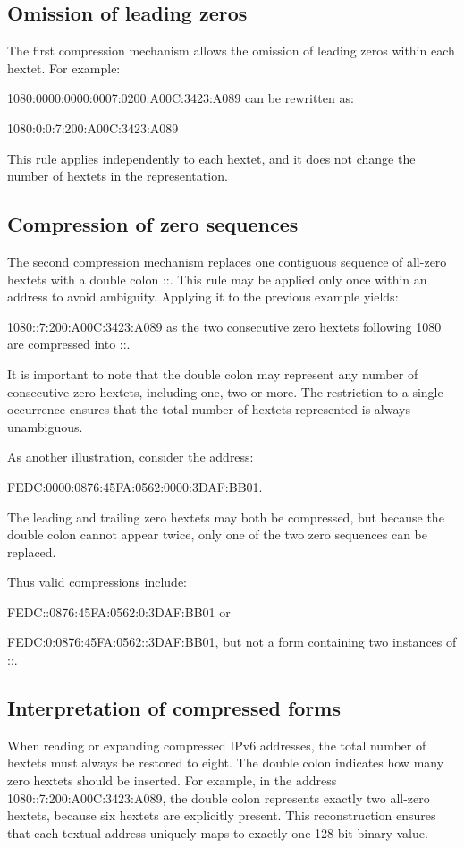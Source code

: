 \subsection{Omission of leading zeros}

The first compression mechanism allows the omission of leading zeros within each hextet. For example:

1080:0000:0000:0007:0200:A00C:3423:A089 can be rewritten as:

1080:0:0:7:200:A00C:3423:A089

This rule applies independently to each hextet, and it does not change the number of hextets in the representation.

\subsection{Compression of zero sequences}

The second compression mechanism replaces one contiguous sequence of all-zero hextets with a double colon ::. This rule may be applied only once within an address to avoid ambiguity. Applying it to the previous example yields:

1080::7:200:A00C:3423:A089 as the two consecutive zero hextets following 1080 are compressed into ::.

It is important to note that the double colon may represent any number of consecutive zero hextets, including one, two or more. The restriction to a single occurrence ensures that the total number of hextets represented is always unambiguous.

As another illustration, consider the address:

FEDC:0000:0876:45FA:0562:0000:3DAF:BB01.

The leading and trailing zero hextets may both be compressed, but because the double colon cannot appear twice, only one of the two zero sequences can be replaced.

Thus valid compressions include:

FEDC::0876:45FA:0562:0:3DAF:BB01 or

FEDC:0:0876:45FA:0562::3DAF:BB01, but not a form containing two instances of ::.

\subsection{Interpretation of compressed forms}

When reading or expanding compressed IPv6 addresses, the total number of hextets must always be restored to eight. The double colon indicates how many zero hextets should be inserted. For example, in the address 1080::7:200:A00C:3423:A089, the double colon represents exactly two all-zero hextets, because six hextets are explicitly present. This reconstruction ensures that each textual address uniquely maps to exactly one 128-bit binary value.

